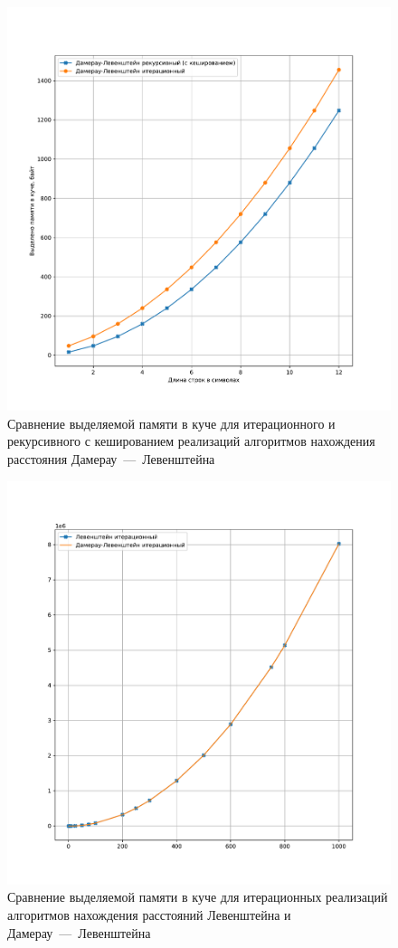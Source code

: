 \begin{figure}[H]
	\centering
	\includegraphics[width=\textwidth]{img/fn_heap.pdf}
	\caption{Сравнение выделяемой памяти в куче для итерационного и рекурсивного с кешированием реализаций алгоритмов нахождения расстояния Дамерау~---~Левенштейна}
	\label{fig:fn_heap}
\end{figure}

\begin{figure}[H]
	\centering
	\includegraphics[width=\textwidth]{img/fn_iter_heap.pdf}
	\caption{Сравнение выделяемой памяти в куче для итерационных реализаций алгоритмов нахождения расстояний Левенштейна и Дамерау~---~Левенштейна}
	\label{fig:fn_iter_heap}
\end{figure}

